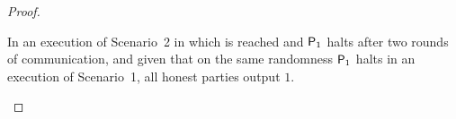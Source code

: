 \begin{proof}
%	
%	
	
	\begin{claim}\label{claim2.2}
		In an execution of Scenario~2 in which \agr is reached and $\mathsf{P}_1$ halts after two rounds of communication, and given that on the same randomness $\mathsf{P}_1$ halts in an execution of Scenario~1, all honest parties output $1$.
	\end{claim}
	

\end{proof}
